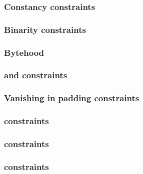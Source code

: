 \subsubsection{Constancy constraints}                                                           \label{rom: generalities: constancies}                  
\subsubsection{Binarity constraints}                                                            \label{rom: generalities: binarities}                   
\subsubsection{Bytehood}                                                                        \label{rom: generalities: bytehood}                     
\subsubsection{\flagSum{} and \weightedFlagSum{} constraints}                                   \label{rom: generalities: flag sum constraints}         
\subsubsection{Vanishing in padding constraints}                                                \label{rom: generalities: vanishing in padding}         
\subsubsection{\cfi{} constraints}                                                              \label{rom: generalities: cfi constraints}              
\subsubsection{\romColumnCfiMax{} constraints}                                                  \label{rom: generalities: cfi max constraints}          
\subsubsection{\done{} constraints}                                                             \label{rom: generalities: done constraints}             
